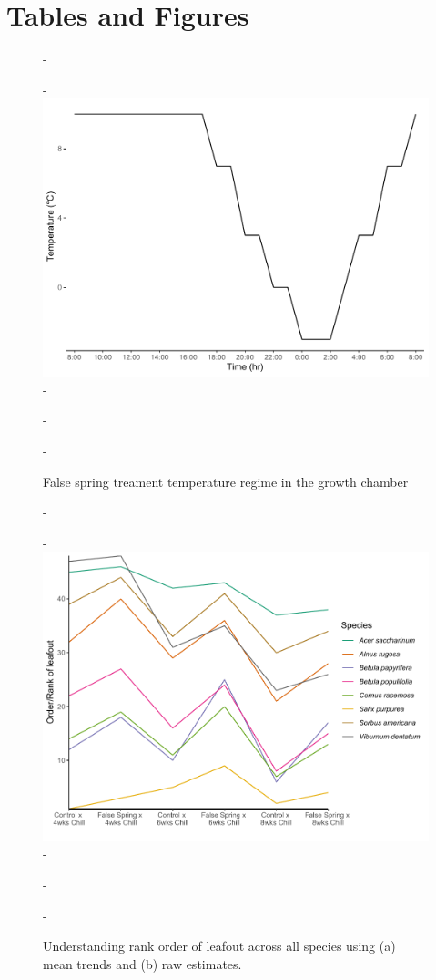 \documentclass{article}\usepackage[]{graphicx}\usepackage[]{color}
\begin{document}


\section*{Tables and Figures}

{\begin{figure} [H]
  -\begin{center}
  -\includegraphics[width=12cm]{..//analyses/figures/growthchamber.pdf}
  -\caption{False spring treament temperature regime in the growth chamber}\label{fig:gccond}
  -\end{center}
  -\end{figure}}

  {\begin{figure} [H]
  -\begin{center}
  -\includegraphics[width=12cm]{..//analyses/figures/leafoutorder_byrank.pdf} 
  -\caption{Understanding rank order of leafout across all species using (a) mean trends and (b) raw estimates. }\label{fig:rank}
  -\end{center}
  -\end{figure}}
  
\end{document}
